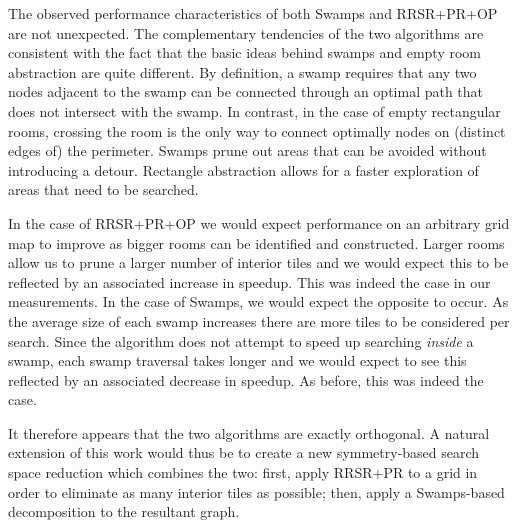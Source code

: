 The observed performance characteristics of both Swamps and RRSR+PR+OP
are not unexpected.
The complementary tendencies of the two algorithms
are consistent with the fact that 
the basic ideas behind swamps and empty room abstraction are quite different.
By definition, a swamp requires that any two nodes adjacent to the swamp
can be connected through an optimal path that does not intersect with the swamp.
In contrast, in the case of empty rectangular rooms, 
crossing the room is the only way to connect optimally nodes on (distinct edges of) the perimeter.
Swamps prune out areas that can be avoided without introducing a detour.
Rectangle abstraction allows for a faster exploration of areas that need to be searched.

In the case of RRSR+PR+OP we would expect performance on an arbitrary grid map to improve as bigger
rooms can be identified and constructed. 
Larger rooms allow us to prune a larger number of interior tiles and we would expect this to be reflected
by an associated increase in speedup. This was indeed the case in our measurements.
In the case of Swamps, we would expect the opposite to occur. As the average size of each swamp increases
there are more tiles to be considered per search. Since the algorithm does not attempt to speed up searching
\emph{inside} a swamp, each swamp traversal takes longer and we would expect to see this reflected
by an associated decrease in speedup. As before, this was indeed the case.

It therefore appears that the two algorithms are exactly orthogonal.
A natural extension of this work would thus be to create a new symmetry-based search space reduction
which combines the two: first, apply RRSR+PR to a grid in order to eliminate as many interior tiles 
as possible; then, apply a Swamps-based decomposition to the resultant graph.

